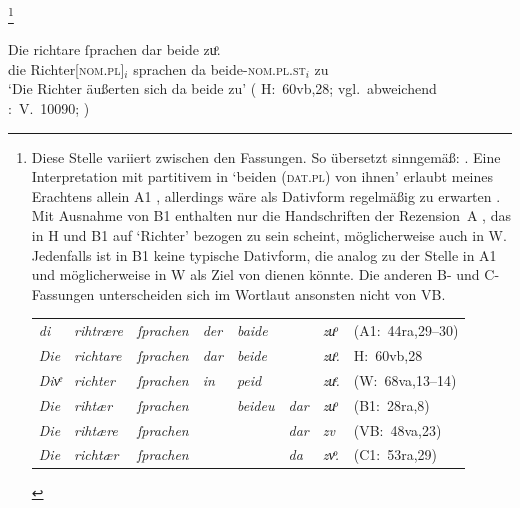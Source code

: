 	\footnote{Diese Stelle variiert zwischen den Fassungen. So übersetzt
		\citeauthor{myers2013} sinngemäß: . Eine Interpretation mit partitivem 
		in  `beiden (\textsc{dat.pl}) von ihnen' erlaubt meines
		Erachtens allein A1 \autocite[vgl.][\pno~\textit{zuo
		sprëchen}]{lexer:mhdhwb}, allerdings wäre als Dativform regelmäßig
		 zu erwarten \autocite[182]{ksw2}. Mit Ausnahme von
		B1 enthalten nur die Handschriften der Rezension~A
		, das in H und B1 auf 
		`Richter' bezogen zu sein scheint, möglicherweise auch in
		W. Jedenfalls ist  in B1 keine
		typische Dativform, die analog zu der Stelle in A1 und
		möglicherweise in W als Ziel von  dienen
		könnte. Die anderen B- und C-Fassungen unterscheiden sich im Wortlaut
		ansonsten nicht von VB.
		
			\begin{tabular}[t]{
				@{}
				>{\itshape}l @{~}
				>{\itshape}l @{~}
				>{\itshape}l @{~}
				>{\itshape}l @{~}
				>{\itshape}l @{~}
				>{\itshape}l @{~}
				>{\itshape}l
				l
				@{}
			}
			di
				& rihtrære
				& ſprachen
				& der
				& baide
				& %
				& zuͦ
				& (A1:~44ra,29--30)
				\\

			Die
				& richtare
				& ſprachen
				& dar
				& beide
				& %
				& zuͦ.
				& H:~60vb,28
				\\

			Divͤ
				& richter
				& ſprachen
				& in
				& peid
				& %
				& zuͤ.
				& (W:~68va,13--14)
				\\

			Die
				& rihtær
				& ſprachen
				& %
				& beideu
				& dar
				& zuͦ
				& (B1:~28ra,8)
				\\

			Die
				& rihtære
				& ſprachen
				& %
				& %
				& dar
				& zv
				& (VB:~48va,23)
				\\

			Die
				& richtær
				& ſprachen
				& %
				& %
				& da
				& zvͦ.
				& (C1:~53ra,29)
				\\
			\end{tabular}
		}

\begin{exe}
\ex \label{ex:gendassgmt2}
	\gll Die richtare ſprachen dar beide zuͦ. \\
		die Richter[\textsc{nom.pl\subM}]$_i$ sprachen da
			beide-\textsc{nom.pl\subM.st}$_i$ zu \\
	\trans `Die Richter äußerten sich da beide zu'
		(%
			H:~60vb,28; vgl.~abweichend
			\KC:~V.~10090;
			\cite[267]{schroeder1895}%
		)
\end{exe}

